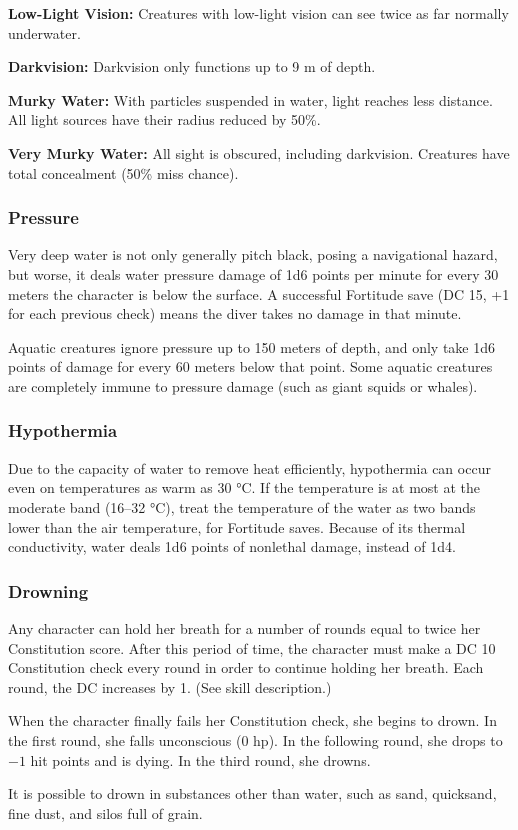 \textbf{Low-Light Vision:} Creatures with low-light vision can see twice as far normally underwater.

\textbf{Darkvision:} Darkvision only functions up to 9 m of depth.

\textbf{Murky Water:} With particles suspended in water, light reaches less distance. All light sources have their radius reduced by 50\%.

\textbf{Very Murky Water:} All sight is obscured, including darkvision. Creatures have total concealment (50\% miss chance).


\subsubsection{Pressure}
Very deep water is not only generally pitch black, posing a navigational hazard, but worse, it deals water pressure damage of 1d6 points per minute for every 30 meters the character is below the surface. A successful Fortitude save (DC 15, +1 for each previous check) means the diver takes no damage in that minute.

Aquatic creatures ignore pressure up to 150 meters of depth, and only take 1d6 points of damage for every 60 meters below that point. Some aquatic creatures are completely immune to pressure damage (such as giant squids or whales).


\subsubsection{Hypothermia}
Due to the capacity of water to remove heat efficiently, hypothermia can occur even on temperatures as warm as 30 °C. If the temperature is at most at the moderate band (16--32 °C), treat the temperature of the water as two bands lower than the air temperature, for Fortitude saves. Because of its thermal conductivity, water deals 1d6 points of nonlethal damage, instead of 1d4.


\subsubsection{Drowning}
Any character can hold her breath for a number of rounds equal to twice her Constitution score. After this period of time, the character must make a DC 10 Constitution check every round in order to continue holding her breath. Each round, the DC increases by 1. (See  skill description.)

When the character finally fails her Constitution check, she begins to drown. In the first round, she falls unconscious (0 hp). In the following round, she drops to $-1$ hit points and is dying. In the third round, she drowns.

It is possible to drown in substances other than water, such as sand, quicksand, fine dust, and silos full of grain.

